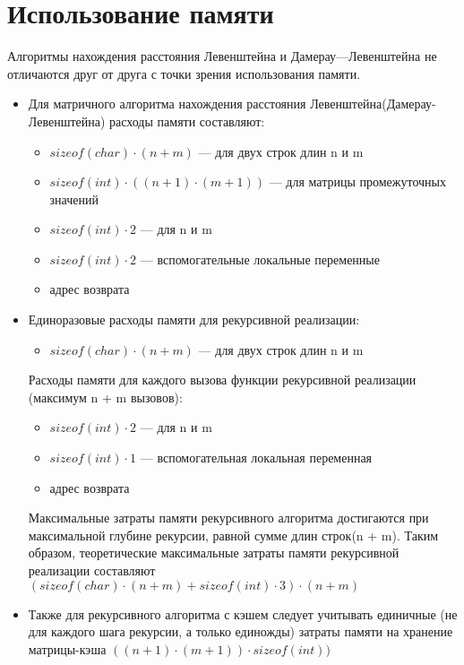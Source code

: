 \section{Использование памяти}

Алгоритмы нахождения расстояния Левенштейна и Дамерау—Левенштейна не отличаются друг от друга с точки зрения использования памяти.

\begin{itemize}
\item Для матричного алгоритма нахождения расстояния Левенштейна(Дамерау-Левенштейна) расходы памяти составляют:
\begin{itemize}
	\item $sizeof(char)\cdot(n + m)$ --- для двух строк длин n и m
	\item $sizeof(int)\cdot((n + 1) \cdot (m + 1))$ --- для  матрицы промежуточных значений
	\item $sizeof(int)\cdot2$ --- для n и m
	\item $sizeof(int)\cdot2$ --- вспомогательные локальные переменные
	\item адрес возврата
\end{itemize}

\item Единоразовые расходы памяти для рекурсивной реализации:
\begin{itemize}
	\item $sizeof(char)\cdot(n + m)$ --- для двух строк длин n и m
\end{itemize}
Расходы памяти для каждого вызова функции рекурсивной реализации (максимум n + m вызовов): 

\begin{itemize}
	\item $sizeof(int)\cdot2$ --- для n и m
	\item $sizeof(int)\cdot1$ --- вспомогательная локальная переменная
	\item адрес возврата
\end{itemize}


Максимальные затраты памяти рекурсивного алгоритма достигаются при максимальной глубине рекурсии, равной сумме длин строк(n + m). Таким образом, теоретические максимальные затраты памяти рекурсивной реализации составляют $(sizeof(char)\cdot(n + m) + sizeof(int)\cdot3)\cdot(n + m) $

\item Также для рекурсивного алгоритма с кэшем следует учитывать единичные (не для каждого шага рекурсии, а только единожды) затраты памяти на хранение матрицы-кэша $((n + 1)\cdot(m + 1))\cdot sizeof(int))$
\end{itemize}


